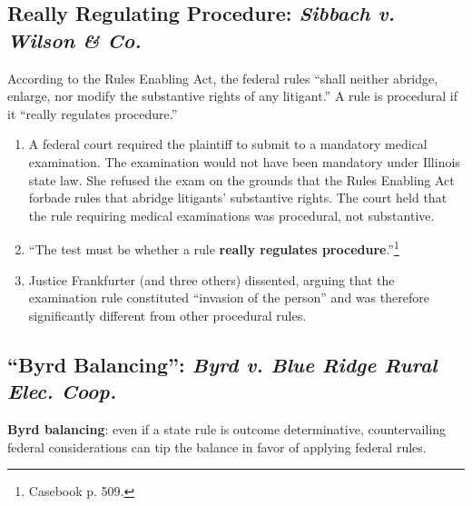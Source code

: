 \subsection{Really Regulating Procedure: \emph{Sibbach v. Wilson \& 
Co.}}

According to the Rules Enabling Act, the federal rules ``shall neither 
abridge, enlarge, nor modify the substantive rights of any litigant.'' A rule 
is procedural if it ``really regulates procedure.''

\begin{enumerate}
    \item A federal court required the plaintiff to submit to a mandatory medical 
    examination. The examination would not have been mandatory under Illinois 
    state law. She refused the exam on the grounds that the Rules Enabling Act 
    forbade rules that abridge litigants' substantive rights. The court held 
    that the rule requiring medical examinations was procedural, not 
    substantive.
    \item ``The test must be whether a rule \textbf{really regulates 
    procedure}.''\footnote{Casebook p. 509.}
    \item Justice Frankfurter (and three others) dissented, arguing that the 
    examination rule constituted ``invasion of the person'' and was therefore 
    significantly different from other procedural rules.
\end{enumerate}

\subsection{``Byrd Balancing'': \emph{Byrd v. Blue Ridge Rural Elec. Coop.}}

\textbf{Byrd balancing}: even if a state rule is outcome determinative, 
countervailing federal considerations can tip the balance in favor of applying 
federal rules.

